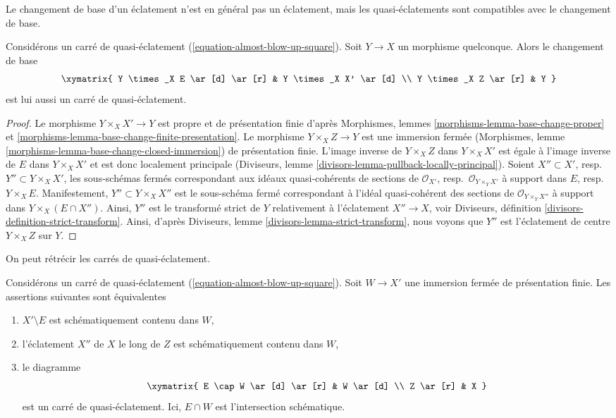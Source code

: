 \medskip\noindent
Le changement de base d'un éclatement n'est en général pas un éclatement,
mais les quasi-éclatements sont compatibles avec le changement de base.

\begin{lemma}
\label{lemma-base-change-almost-blow-up}
Considérons un carré de quasi-éclatement (\ref{equation-almost-blow-up-square}).
Soit $Y \to X$ un morphisme quelconque. Alors le changement de base
$$
\xymatrix{
Y \times_X E \ar[d] \ar[r] & Y \times_X X' \ar[d] \\
Y \times_X Z \ar[r] & Y
}
$$
est lui aussi un carré de quasi-éclatement.
\end{lemma}

\begin{proof}
Le morphisme $Y \times_X X' \to Y$ est propre et de présentation finie
d'après Morphismes, lemmes \ref{morphisms-lemma-base-change-proper} et
\ref{morphisms-lemma-base-change-finite-presentation}.
Le morphisme $Y \times_X Z \to Y$ est une immersion fermée
(Morphismes, lemme \ref{morphisms-lemma-base-change-closed-immersion}) de
présentation finie. L'image inverse de $Y \times_X Z$ dans $Y \times_X X'$
est égale à l'image inverse de $E$ dans $Y \times_X X'$ et est donc
localement principale
(Diviseurs, lemme \ref{divisors-lemma-pullback-locally-principal}).
Soient $X'' \subset X'$, resp.\ $Y'' \subset Y \times_X X'$, les sous-schémas fermés
correspondant aux idéaux quasi-cohérents de sections de
$\mathcal{O}_{X'}$, resp.\ $\mathcal{O}_{Y \times_Y X'}$
à support dans $E$, resp.\ $Y \times_X E$.
Manifestement, $Y'' \subset Y \times_X X''$ est le sous-schéma fermé
correspondant à l'idéal quasi-cohérent des sections de
$\mathcal{O}_{Y \times_Y X''}$ à support dans $Y \times_X (E \cap X'')$.
Ainsi, $Y''$ est le transformé strict de $Y$ relativement à l'éclatement
$X'' \to X$, voir
Diviseurs, définition \ref{divisors-definition-strict-transform}.
Ainsi, d'après Diviseurs, lemme \ref{divisors-lemma-strict-transform},
nous voyons que $Y''$ est l'éclatement de centre $Y \times_X Z$ sur $Y$.
\end{proof}

\noindent
On peut rétrécir les carrés de quasi-éclatement.

\begin{lemma}
\label{lemma-shrink-almost-blow-up}
Considérons un carré de quasi-éclatement (\ref{equation-almost-blow-up-square}).
Soit $W \to X'$ une immersion fermée de présentation finie.
Les assertions suivantes sont équivalentes
\begin{enumerate}
\item $X' \setminus E$ est schématiquement contenu dans $W$,
\item l'éclatement $X''$ de $X$ le long de $Z$ est schématiquement contenu dans $W$,
\item le diagramme
$$
\xymatrix{
E \cap W \ar[d] \ar[r] & W \ar[d] \\
Z \ar[r] & X
}
$$
est un carré de quasi-éclatement. Ici, $E \cap W$ est l'intersection
schématique.
\end{enumerate}
\end{lemma}

